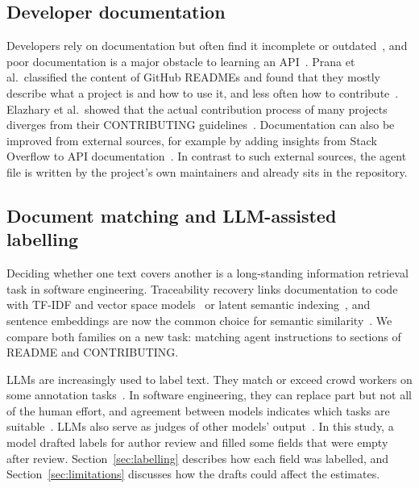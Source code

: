 \documentclass[sigconf,nonacm]{acmart}
\begin{document}
\subsection{Developer documentation}

Developers rely on documentation but often find it incomplete or
outdated~\cite{lethbridge2003documentation,aghajani2019issues,aghajani2020practitioners}, and poor
documentation is a major obstacle to learning an API~\cite{robillard2009apis}. Prana et al.\
classified the content of GitHub READMEs and found that they mostly describe what a project is and
how to use it, and less often how to contribute~\cite{prana2019readme}. Elazhary et al.\ showed that
the actual contribution process of many projects diverges from their CONTRIBUTING
guidelines~\cite{elazhary2019guidelines}. Documentation can also be improved from external sources,
for example by adding insights from Stack Overflow to API documentation~\cite{treude2016augmenting}.
In contrast to such external sources, the agent file is written by the project's own maintainers
and already sits in the repository.

\subsection{Document matching and LLM-assisted labelling}

Deciding whether one text covers another is a long-standing information retrieval task in software
engineering. Traceability recovery links documentation to code with TF-IDF and vector space
models~\cite{antoniol2002traceability,salton1988termweighting} or latent semantic
indexing~\cite{marcus2003lsi}, and sentence embeddings are now the common choice for semantic
similarity~\cite{reimers2019sbert}. We compare both families on a new task: matching agent
instructions to sections of README and CONTRIBUTING.

LLMs are increasingly used to label text. They match or exceed crowd workers on some annotation
tasks~\cite{gilardi2023chatgpt}. In software engineering, they can replace part but not all of the
human effort, and agreement between models indicates which tasks are
suitable~\cite{ahmed2025llmannotation}. LLMs also serve as judges of other models'
output~\cite{zheng2023judge}. In this study, a model drafted labels for author review and filled
some fields that were empty after review. Section~\ref{sec:labelling} describes how each field was
labelled, and Section~\ref{sec:limitations} discusses how the drafts could affect the estimates.
\end{document}
